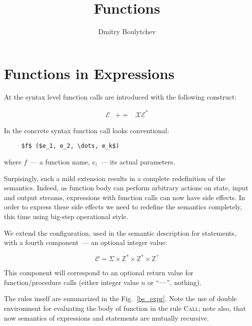 \documentclass{article}
\title{Functions}
\author{Dmitry Boulytchev}
\def\transarrow{\xrightarrow}
\newcommand{\setarrow}[1]{\def\transarrow{#1}}
\def\subarrow{}
\newcommand{\setsubarrow}[1]{\def\subarrow{#1}}
\newcommand{\rulename}[1]{\textsc{#1}}
\theoremstyle{definition}
\begin{document}
\maketitle

\section{Functions in Expressions}

At the syntax level function calls are introduced with the following construct: 

\[
\begin{array}{rcl}
  \mathscr E & += & \mathscr X \mathscr E^*
\end{array}
\]

In the concrete syntax function call looks conventional:

\begin{lstlisting}
     $f$ ($e_1, e_2, \dots, e_k$)
\end{lstlisting}

where $f$~--- a function name, $e_i$~--- its actual parameters.

Surpisingly, such a mild extension results in a complete redefinition of the semantics. Indeed, as function body can perform
arbitrary actions on state, input and output streams, expressions with function calls can now have side effects. In order to express these
side effects we need to redefine the semantics completely, this time using big-step operational style.

We extend the configuration, used in the semantic description for statements, with a fourth component~--- an optional integer value:

\[
\mathscr C = \Sigma \times \mathbb Z^* \times \mathbb Z^* \times \mathbb Z^?
\]

This component will correspond to an optional return value for function/procedure calls (either integer value $n$ or ``$\hbox{---}$'', nothing).

The rules inself are summarized in the Fig.~\ref{bs_expr}. Note the use of double environment for evaluating the body of function in the rule
\rulename{Call}; note also, that now semantics of expressions and statements are mutually recursive.

\setarrow{\xRightarrow}
\setsubarrow{_{\mathscr E}}
\end{document}
